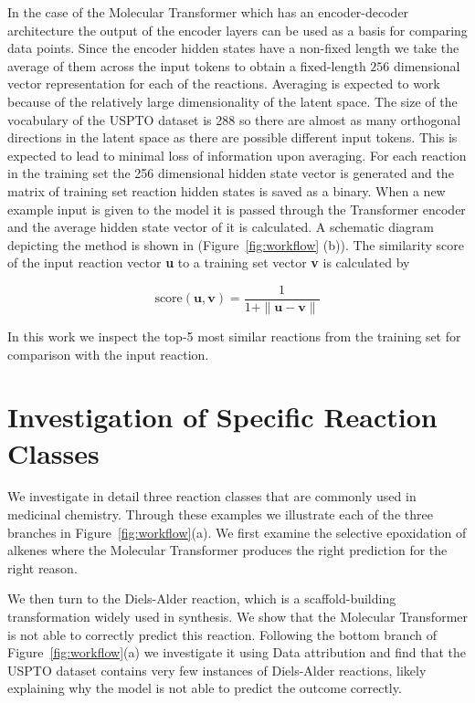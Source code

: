 In the case of the Molecular Transformer which has an encoder-decoder architecture the output of the encoder layers can be used as a basis for comparing data points. Since the encoder hidden states have a non-fixed length we take the average of them across the input tokens to obtain a fixed-length $256$ dimensional vector representation for each of the reactions. Averaging is expected to work because of the relatively large dimensionality of the latent space. The size of the vocabulary of the USPTO dataset is 288 so there are almost as many orthogonal directions in the latent space as there are possible different input tokens. This is expected to lead to minimal loss of information upon averaging. For each reaction in the training set the 256 dimensional hidden state vector is generated and the matrix of training set reaction hidden states is saved as a binary. When a new example input is given to the model it is passed through the Transformer encoder and the average hidden state vector of it is calculated. A schematic diagram depicting the method is shown in (Figure~\ref{fig:workflow} (b)). The similarity score of the input reaction vector \textbf{u} to a training set vector \textbf{v} is calculated by

\begin{equation}
    \textrm{score}(\textbf{u},\textbf{v}) = \frac{1}{1 + \|\textbf{u} - \textbf{v} \|}
\end{equation}

In this work we inspect the top-5 most similar reactions from the training set for comparison with the input reaction.

\section{Investigation of Specific Reaction Classes}

We investigate in detail three reaction classes that are commonly used in medicinal chemistry. Through these examples we illustrate each of the three branches in Figure~\ref{fig:workflow}(a). We first examine the selective epoxidation of alkenes where the Molecular Transformer produces the right prediction for the right reason.

We then turn to the Diels-Alder reaction, which is a scaffold-building transformation widely used in synthesis. We show that the Molecular Transformer is not able to correctly predict this reaction. Following the bottom branch of Figure~\ref{fig:workflow}(a) we investigate it using Data attribution and find that the USPTO dataset contains very few instances of Diels-Alder reactions, likely explaining why the model is not able to predict the outcome correctly.

